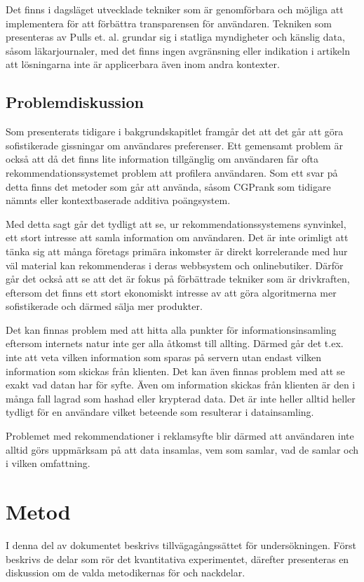 \documentclass[a4paper,11pt]{article}
\begin{document}
{Det finns i dagsläget utvecklade tekniker som är genomförbara och möjliga att implementera för att förbättra transparensen för användaren. Tekniken som presenteras av Pulls et. al. \cite{?} grundar sig i statliga myndigheter och känslig data, såsom läkarjournaler, med det finns ingen avgränsning eller indikation i artikeln att lösningarna inte är applicerbara även inom andra kontexter. 

\subsection{Problemdiskussion}
Som presenterats tidigare i bakgrundskapitlet framgår det att det går att göra sofistikerade gissningar om användares preferenser. Ett gemensamt problem är också att då det finns lite information tillgänglig om användaren får ofta rekommendationssystemet problem att profilera användaren. Som ett svar på detta finns det metoder som går att använda, såsom CGPrank som tidigare nämnts eller kontextbaserade additiva poängsystem. 

Med detta sagt går det tydligt att se, ur rekommendationssystemens synvinkel, ett stort intresse att samla information om användaren. Det är inte orimligt att tänka sig att många företags primära inkomster är direkt korrelerande med hur väl material kan rekommenderas i deras webbsystem och onlinebutiker. Därför går det också att se att det är fokus på förbättrade tekniker som är drivkraften, eftersom det finns ett stort ekonomiskt intresse av att göra algoritmerna mer sofistikerade och därmed sälja mer produkter. 

Det kan finnas problem med att hitta alla punkter för informationsinsamling eftersom internets natur inte ger alla åtkomst till allting. Därmed går det t.ex. inte att veta vilken information som sparas på servern utan endast vilken information som skickas från klienten. Det kan även finnas problem med att se exakt vad datan har för syfte. Även om information skickas från klienten är den i många fall lagrad som hashad eller krypterad data. Det är inte heller alltid heller tydligt för en användare vilket beteende som resulterar i datainsamling. 

Problemet med rekommendationer i reklamsyfte blir därmed att användaren inte alltid görs uppmärksam på att data insamlas, vem som samlar, vad de samlar och i vilken omfattning. 

\section{Metod}
I denna del av dokumentet beskrivs tillvägagångssättet för undersökningen. Först beskrivs de delar som rör det kvantitativa experimentet, därefter presenteras en diskussion om de valda metodikernas för och nackdelar. 

}
\end{document}
